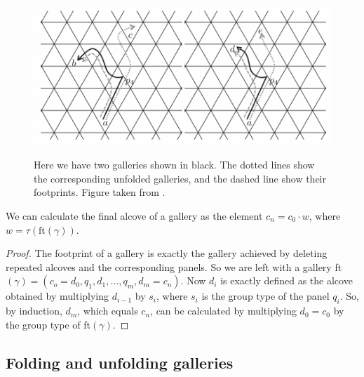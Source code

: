 \documentclass[11pt]{article}
\begin{document}
\begin{figure}[!htbp]
    \begin{center}
    \includegraphics[scale=0.4]{Screenshot 2023-04-18 at 17.30.14.png}\\
    \end{center}
    \caption{Here we have two galleries shown in black. The dotted lines show the corresponding unfolded galleries, and the dashed line show their footprints. Figure taken from \cite[p.129]{SHA}. }
\end{figure}
\begin{lemma}
    We can calculate the final alcove of a gallery as the element $c_n=c_0\cdot w$, where $w=\tau(\text{ft}(\gamma))$.
\end{lemma}

\begin{proof}
    The footprint of a gallery is exactly the gallery achieved by deleting repeated alcoves and the corresponding panels. So we are left with a gallery ft$(\gamma)=(c_o=d_0,q_1,d_1,\hdots ,q_m,d_m=c_n)$. Now $d_i$ is exactly defined as the alcove obtained by multiplying $d_{i-1}$ by $s_i$, where $s_i$ is the group type of the panel $q_i$. So, by induction, $d_m$, which equals $c_n$, can be calculated by multiplying $d_0=c_0$ by the group type of ft$(\gamma)$. 
\end{proof}

\subsection{Folding and unfolding galleries}
\end{document}
